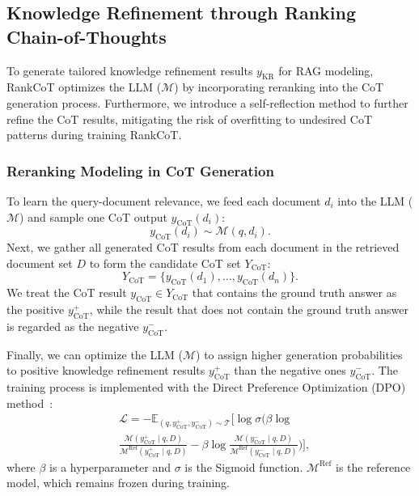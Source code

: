 \subsection{Knowledge Refinement through Ranking Chain-of-Thoughts}\label{sec:rankcot}
To generate tailored knowledge refinement results $y_\text{KR}$ for RAG modeling, RankCoT optimizes the LLM ($\mathcal{M}$) by incorporating reranking into the CoT generation process. Furthermore, we introduce a self-reflection method to further refine the CoT results, mitigating the risk of overfitting to undesired CoT patterns during training RankCoT.

\subsubsection{Reranking Modeling in CoT Generation}
To learn the query-document relevance, we feed each document $d_i$ into the LLM ($\mathcal{M}$) and sample one CoT output $y_\text{CoT} (d_i)$:
\begin{equation}
\label{eq:CoTrank}
 y_\text{CoT} (d_i) \sim \mathcal{M} (q, d_i).
\end{equation}
Next, we gather all generated CoT results from each document in the retrieved document set $D$ to form the candidate CoT set $Y_\text{CoT}$:
\begin{equation}
 Y_\text{CoT} =  \{y_\text{CoT} (d_1), \dots, y_\text{CoT} (d_n)\}.
\end{equation}
We treat the CoT result $y_\text{CoT} \in Y_\text{CoT}$ that contains the ground truth answer as the positive $y_\text{CoT}^+$, while the result that does not contain the ground truth answer is regarded as the negative $y_\text{CoT}^-$.

Finally, we can optimize the LLM ($\mathcal{M}$) to assign higher generation probabilities to positive knowledge refinement results $y_\text{CoT}^+$ than the negative ones $y_\text{CoT}^-$. The training process is implemented with the Direct Preference Optimization (DPO) method~\cite{rafailov2024direct}:
\begin{equation}
\begin{aligned}
\label{eq:dpo}
& \mathcal{L} = 
- \mathbb{E}_{(q, y_\text{CoT}^+,y_\text{CoT}^-) \sim \mathcal{T}} \Big[ \log \sigma \Big(  \beta \log \\
&\frac{\mathcal{M}(y_\text{CoT}^+ \mid  q, D)}{\mathcal{M}^\text{Ref}(y_\text{CoT}^+ \mid  q, D)} - 
\beta \log \frac{\mathcal{M}(y_\text{CoT}^- \mid q, D)}{\mathcal{M}^\text{Ref}(y_\text{CoT}^- \mid q, D)} \Big) \Big],
\end{aligned}
\end{equation}
where $\beta$ is a hyperparameter and $\sigma$ is the Sigmoid function. $\mathcal{M}^\text{Ref}$ is the reference model, which remains frozen during training.

